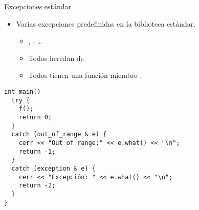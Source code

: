 \begin{frame}[t,fragile]{Excepciones estándar}
\begin{itemize}
  \item Varias excepciones predefinidas en la biblioteca estándar.
    \begin{itemize}
      \item {}, , \ldots
      \item Todos heredan de 
      \item Todos tienen una función miembro .
    \end{itemize}
\end{itemize}
\begin{lstlisting}
int main()
  try {
    f();
    return 0;
  }
  catch (out_of_range & e) {
    cerr << "Out of range:" << e.what() << "\n";
    return -1;
  }
  catch (exception & e) {
    cerr << "Excepción: " << e.what() << "\n";
    return -2;
  }
}
\end{lstlisting}
\end{frame}
